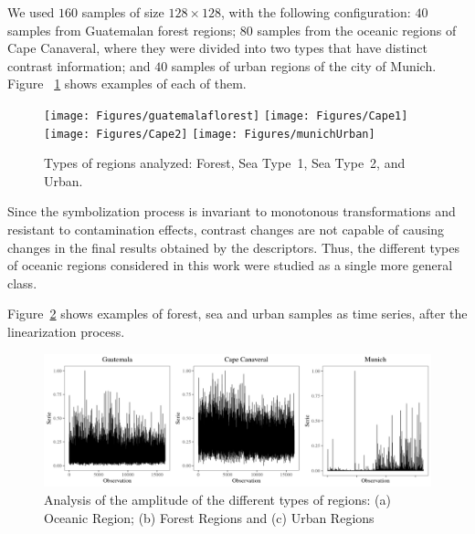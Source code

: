 \documentclass{isprs}
\begin{document}
We used $160$ samples of size $128\times128$, with the following configuration:
$40$ samples from Guatemalan forest regions;
$80$ samples from the oceanic regions of Cape Canaveral, where they were divided into two types that have distinct contrast information; and
$40$ samples of urban regions of the city of Munich.
Figure ~\ref{fig:RegionsSAR} shows examples of each of them.

\begin{figure}[hbt]
	\centering
	\texttt{[image: Figures/guatemalaflorest]}
	\texttt{[image: Figures/Cape1]}
	\texttt{[image: Figures/Cape2]}
	\texttt{[image: Figures/munichUrban]}	
	\caption{Types of regions analyzed: Forest, Sea Type~1, Sea Type~2, and Urban.}\label{fig:RegionsSAR}
\end{figure} 

Since the symbolization process is invariant to monotonous transformations and resistant to contamination effects, contrast chan\-ges are not capable of causing changes in the final results obtained by the descriptors.
Thus, the different types of oceanic regions considered in this work were studied as a single more general class.



Figure~\ref{fig:AmplitudeSAR} shows examples of forest, sea and urban samples as time series, after the linearization process.

\begin{figure}[hbt]
	\includegraphics[width=\columnwidth]{Figures/SAR_signal.pdf}
	\caption{Analysis of the amplitude of the different types of regions: (a) Oceanic Region; (b) Forest Regions and (c) Urban Regions}
	\label{fig:AmplitudeSAR}
\end{figure}
\end{document}
